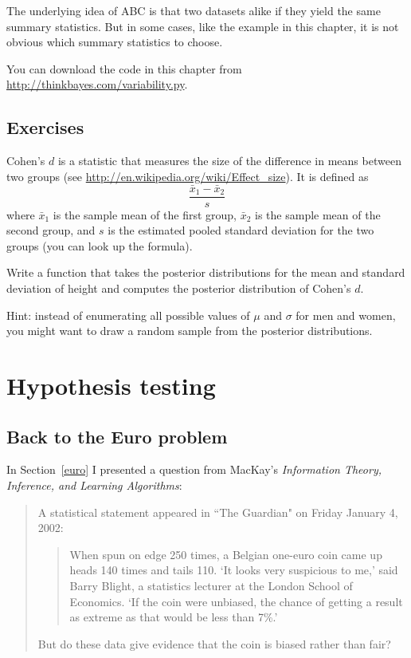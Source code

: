 \documentclass[12pt]{book}
\begin{document}
The underlying idea of ABC is that two datasets alike if they yield
the same summary statistics.  But in some cases, like the example in
this chapter, it is not obvious which summary statistics to choose.

You can download the code in this chapter from
\url{http://thinkbayes.com/variability.py}.


\section{Exercises}

\begin{exercise}

Cohen's $d$ is a statistic that measures the size of the difference in
means between two groups (see
\url{http://en.wikipedia.org/wiki/Effect_size}).  It is defined as
%
\[ \frac{\bar{x}_1 - \bar{x}_2}{s} \]
%
where $\bar{x}_1$ is the sample mean of the first group, $\bar{x}_2$
is the sample mean of the second group, and $s$ is the estimated
pooled standard deviation for the two groups (you can look up the
formula).

Write a function that takes the posterior distributions for
the mean and standard deviation of height and computes the
posterior distribution of Cohen's $d$.

Hint: instead of enumerating all possible values of $\mu$ and
$\sigma$ for men and women, you might want to draw a random sample
from the posterior distributions.

\end{exercise}



\chapter{Hypothesis testing}

\section{Back to the Euro problem}

In Section~\ref{euro} I presented a question from MacKay's {\it Information
  Theory, Inference, and Learning Algorithms}:

\begin{quote}
A statistical statement appeared in ``The Guardian" on Friday January 4, 2002:

  \begin{quote}
        When spun on edge 250 times, a Belgian one-euro coin came
        up heads 140 times and tails 110.  `It looks very suspicious
        to me,' said Barry Blight, a statistics lecturer at the London
        School of Economics.  `If the coin were unbiased, the chance of
        getting a result as extreme as that would be less than 7\%.'
        \end{quote}

But do these data give evidence that the coin is biased rather than fair?
\end{quote}
\end{document}
